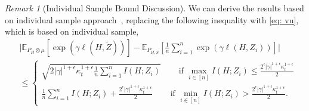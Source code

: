 \documentclass{article}
\theoremstyle{plain}
\theoremstyle{plain}
\theoremstyle{definition}
\theoremstyle{remark}
\newtheorem{remark}[theorem]{Remark}
\newcommand{\mbE}{\mathbb{E}}
\begin{document}
\begin{remark}[Individual Sample Bound Discussion]
We can derive the results based on individual sample approach~\citep{bu2020tightening}, replacing the following inequality with \eqref{eq: vu}, which is based on individual sample, 
    \begin{equation}\label{eq:finaleq}
    \begin{split}
        &\Big|\mbE_{P_{H}\otimes \mu}[ \exp(\gamma \ell(H,\tilde Z))]-\mbE_{P_{H,S}}[\frac{1}{n}\sum_{i=1}^n \exp(\gamma \ell(H,Z_i))]\Big|\\
        &\leq \begin{cases}
            \sqrt{2|\gamma|^{1+\epsilon} \kappa_t^{1+\epsilon}\frac{1}{n}\sum_{i=1}^nI(H;Z_i)}&\quad \mbox{ if } \max_{i\in[n]} I(H;Z_i)\leq \frac{2^{\epsilon}|\gamma|^{1+\epsilon} \kappa_t^{1+\epsilon}}{2}\\
            \frac{1}{n}\sum_{i=1}^nI(H;Z_i)+\frac{2^{\epsilon}|\gamma|^{1+\epsilon} \kappa_t^{1+\epsilon}}{2} & \mbox{ if } \min_{i\in[n]}I(H;Z_i)> \frac{2^{\epsilon}|\gamma|^{1+\epsilon} \kappa_t^{1+\epsilon}}{2}
        .\end{cases}
    \end{split}
    \end{equation}
\end{remark}
\end{document}
